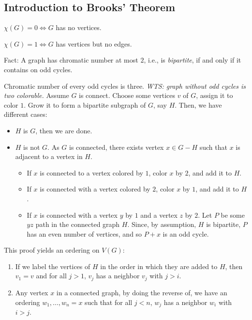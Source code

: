 \subsection{Introduction to Brooks' Theorem}
\begin{ax}{}
	$\chi(G)=0\iff G$ has no vertices.	
\end{ax}
\begin{ax}{}
	$\chi(G)=1\iff G$ has vertices but no edges.
\end{ax}
\begin{prop}{Fact: }
	A graph has chromatic number at most $2$, i.e., is \textit{bipartite}, if and only if it contains on odd cycles.	
\end{prop}
\begin{prf}
	Chromatic number of every odd cycles is three. \textit{WTS: graph without	odd cycles is two colorable.} Assume $G$ is connect. Choose some vertices $v$ of $G$, assign it to color $1$. Grow it to form a bipartite subgraph of $G$, say $H$. Then, we have different cases: 
	\begin{itemize}
		\item $H$ is $G$, then we are done.
		\item $H$ is not $G$. As $G$ is connected, there exists vertex $x\in G-H$ such that $x$ is adjacent to a vertex in $H$.
		\begin{itemize}
			\item If $x$ is connected to a vertex colored by $1$, color $x$ by $2$, and add it to $H$.
			\item If $x$ is connected with a vertex colored by $2$, color $x$ by $1$, and add it to $H$.
			\item If $x$ is connected with a vertex $y$ by $1$ and a vertex $z$ by $2$. Let $P$ be some $yz$ path in the connected graph $H$. Since, by assumption, $H$ is bipartite, $P$ has an even number of vertices, and so $P+x$ is an odd cycle.
		\end{itemize}
	\end{itemize}
\end{prf}
\begin{rmk}
	This proof yields an ordering on $V(G)$: 
	\begin{enumerate}
		\item If we label the vertices of $H$ in the order in which they are added to $H$, then $v_1=v$ and for all $j>1$, $v_j$ has a neighbor $v_j$ with $j>i$.
		\item Any vertex $x$ in a connected graph, by doing the reverse of, we have an ordering $w_1,\dots,w_n=x$ such that for all $j<n$, $w_j$ has a neighbor $w_i$ with $i>j$.
	\end{enumerate}	
\end{rmk}
